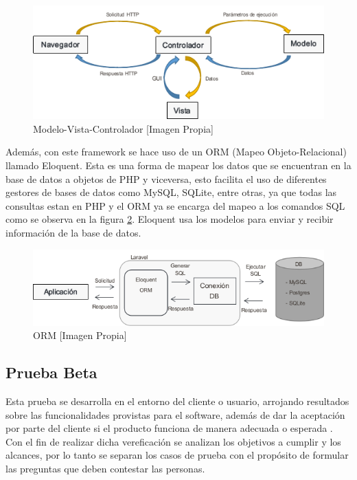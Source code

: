 \begin{figure}[!t]
	\centering
	\caption{Modelo-Vista-Controlador [Imagen Propia]}
	\label{fig:mvc}
	\includegraphics[width=0.8\linewidth]{Imagenes/MVC}
\end{figure}

Además, con este framework se hace uso de un ORM (Mapeo Objeto-Relacional) llamado Eloquent. Esta es una forma de mapear los datos que se encuentran en la base de datos a objetos de PHP y viceversa, esto facilita el uso de diferentes gestores de bases de datos como MySQL, SQLite, entre otras, ya que todas las consultas estan en PHP y el ORM ya se encarga del mapeo a los comandos SQL como se observa en la figura \ref{fig:orm}. Eloquent usa los modelos para enviar y recibir información de la base de datos\cite{Eloq}.\\

\begin{figure}[!t]
	\centering
	\caption[ORM]{ORM [Imagen Propia]}
	\label{fig:orm}
	\includegraphics[width=0.9\linewidth]{Imagenes/ORM}
\end{figure}

\subsection{Prueba Beta}

Esta prueba se desarrolla en el entorno del cliente o usuario, arrojando resultados sobre las funcionalidades provistas para el software, además de dar la aceptación por parte del cliente si el producto funciona de manera adecuada o esperada \cite{PB}. Con el fin de realizar dicha vereficación se analizan los objetivos a cumplir y los alcances, por lo tanto se separan los casos de prueba con el propósito de formular las preguntas que deben contestar las personas.\\

